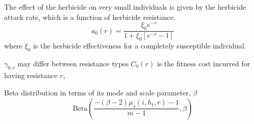 \documentclass[12pt, a4paper]{article}
\begin{document}
The effect of the herbicide on very small individuals is given by the herbicide attack rate, which is a function of herbicide resistance. 
\begin{equation} \label{eq:herb_attack_int}
	a_0(r) = \frac{\xi_0 e^{-r}}{1 + \xi_0 [e^{-r} - 1]}
\end{equation} 
where $\xi_0$ is the herbicide effectiveness for a completely susceptible individual.    


 $\gamma_{0,r}$ may differ between resistance types $C_0(r)$ is the fitness cost incurred for having resistance $r$,        

Beta distribution in terms of its mode and scale parameter, $\beta$
\begin{equation}
	\text{Beta}\left(\frac{-(\beta - 2)\mu_s(i, h_t, r) - 1}{m - 1}, \beta \right)
\end{equation}



 

\end{document}

